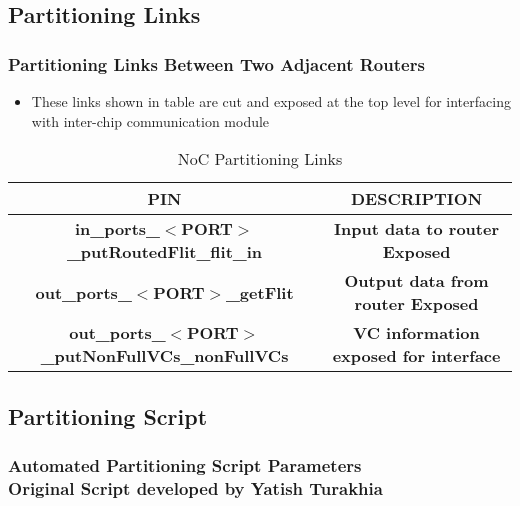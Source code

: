 \subsection{Partitioning Links}
\begin{frame}
\frametitle{Partitioning Links Between Two Adjacent Routers}
\begin{itemize}
	\item{These links shown in table are cut and exposed at the top level for interfacing with inter-chip communication module}
\end{itemize}
\begin{table}
\tiny
\caption{NoC Partitioning Links}
 \begin{tabular}{||c | c||} 
 \hline
					  \textbf{PIN}	  & \textbf{DESCRIPTION} 				\\ \hline
\textbf{in\_ports\_$<$PORT$>$\_putRoutedFlit\_flit\_in}   & \textbf{Input data to router Exposed}		\\
	 \textbf{out\_ports\_$<$PORT$>$\_getFlit} 	  & \textbf{Output data from router Exposed}			\\
\textbf{out\_ports\_$<$PORT$>$\_putNonFullVCs\_nonFullVCs}& \textbf{VC information exposed for interface}	\\
\hline
\end{tabular}
\end{table}   %
\end{frame}

\subsection{Partitioning Script}
\begin{frame}
\frametitle{Automated Partitioning Script Parameters \\ 
\tiny{Original Script developed by Yatish Turakhia}}
\tiny
    
\end{frame}
